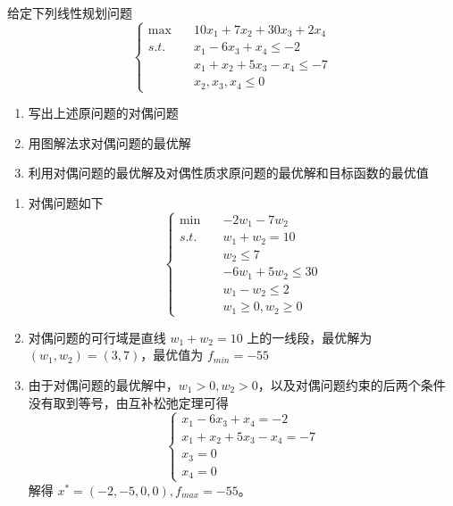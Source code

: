 \begin{problem}
    给定下列线性规划问题
    \[\begin{cases}
        \max \quad &10x_1 + 7x_2 + 30x_3 + 2x_4 \\
        s.t. \quad &x_1 - 6x_3 + x_4 \le -2\\
        &x_1 + x_2 + 5x_3 - x_4 \le -7\\
        &x_2, x_3, x_4 \le 0
    \end{cases}\]
    \begin{enumerate}
        \item 写出上述原问题的对偶问题
        \item 用图解法求对偶问题的最优解
        \item 利用对偶问题的最优解及对偶性质求原问题的最优解和目标函数的最优值
    \end{enumerate}
\end{problem}
\begin{solution}
    \begin{enumerate}
        \item 对偶问题如下 \[\begin{cases}
            \min \quad &-2w_1 - 7w_2\\
            s.t. \quad &w_1 + w_2 = 10\\
            &w_2 \le 7\\
            &-6w_1 + 5w_2 \le 30\\
            &w_1 - w_2 \le 2\\
            &w_1 \ge 0, w_2 \ge 0
        \end{cases}\]
        \item 对偶问题的可行域是直线 $w_1 + w_2 = 10$ 上的一线段，最优解为 $(w_1, w_2) = (3, 7)$，最优值为 $f_{min} = -55$
        \item 由于对偶问题的最优解中，$w_1 > 0, w_2 > 0$，以及对偶问题约束的后两个条件没有取到等号，由互补松弛定理可得
        \[\begin{cases}
            x_1 - 6x_3 + x_4 = -2\\
            x_1 + x_2 + 5x_3 - x_4 = -7\\
            x_3 = 0\\
            x_4 = 0
        \end{cases}\]
        解得 $x^* = (-2, -5, 0, 0), f_{max} = -55$。
    \end{enumerate}
\end{solution}

